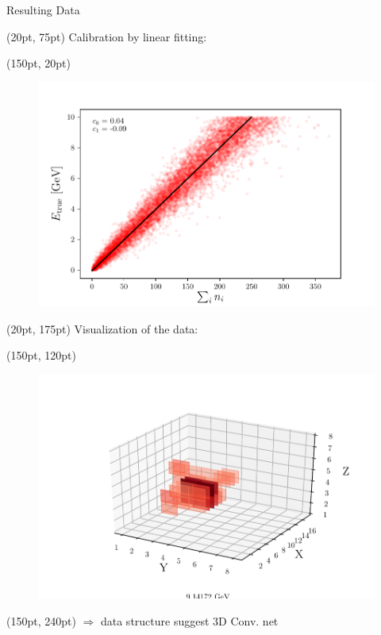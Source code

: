 \documentclass[10pt]{beamer}
\begin{document}
\begin{frame}{Resulting Data}
    \begin{textblock*}{250pt}(20pt, 75pt)
    Calibration by linear fitting:
  \end{textblock*}
  \begin{textblock*}{150pt}(150pt, 20pt)
    \begin{figure}[htp]
      \includegraphics[width=\textwidth]{../images/e-vs-sum_n_fit.png}
    \end{figure}
  \end{textblock*}
  \begin{textblock*}{250pt}(20pt, 175pt)
    Visualization of the data:
  \end{textblock*}
  \begin{textblock*}{135pt}(150pt, 120pt)
    \begin{figure}[htp]
      \includegraphics[width=1.1\textwidth]{../images/data_display.png}
    \end{figure}
  \end{textblock*}
  \begin{textblock*}{250pt}(150pt, 240pt)
    $\Rightarrow$ data structure suggest 3D Conv. net
  \end{textblock*}
\end{frame}
\end{document}

